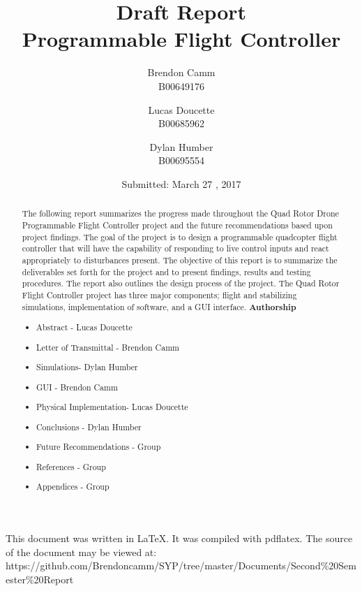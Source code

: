\documentclass[12pt, twoside, letterpaper,titlepage]{article}
\title{Draft Report \\ Programmable Flight Controller}
\author{Brendon Camm \\ B00649176 \and Lucas Doucette \\ B00685962 \and Dylan Humber \\ B00695554}
\date{Submitted: March 27 , 2017}
\begin{document}
	\maketitle
	\newpage
	\vspace*{2in}
	This document was written in \LaTeX.  It was compiled with pdflatex.  The source of the document may be viewed at: \newline\small	https://github.com/Brendoncamm/SYP/tree/master/Documents/Second\%20Semester\%20Report
	\vspace*{4in}
	\pagebreak

	\newpage
	\begin{abstract} %
	The following report summarizes the progress made throughout the Quad Rotor Drone Programmable Flight Controller project and the future recommendations based upon project findings. The goal of the project is to design a programmable quadcopter flight controller that will have the capability of responding to live control inputs and react appropriately to disturbances present. The objective of this report is to summarize the deliverables set forth for the project and to present findings, results and testing procedures. The report also outlines the design process of the project. The Quad Rotor Flight Controller project has three major components; flight and stabilizing simulations, implementation of software, and a GUI interface.  	
	\textbf{Authorship}
	\begin{itemize}
		\itemsep-.5em
		\item{Abstract - Lucas Doucette}
		\item{Letter of Transmittal - Brendon Camm}
		\item{Simulations- Dylan Humber}
		\item{GUI - Brendon Camm}
		\item{Physical Implementation- Lucas Doucette}
		\item{Conclusions - Dylan Humber}
		\item{Future Recommendations - Group}
		\item{References - Group}
		\item{Appendices - Group}
	\end{itemize}
	
	\end{abstract}
	\setcounter{tocdepth}{2}
	\tableofcontents
	\pagebreak
	
	
\end{document}
